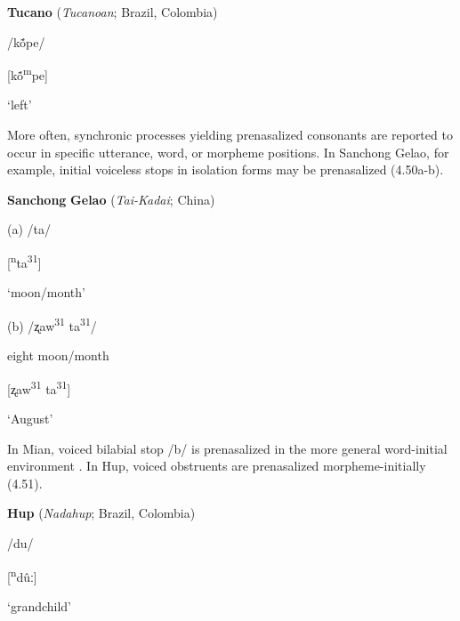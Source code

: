 \ea\label{ex:(4.49)}
  \textbf{Tucano} (\textit{Tucanoan}; Brazil, Colombia)



/kṍpe/



[kṍ\textsuperscript{m}pe]



‘left’



\citep[11]{West1980}


\z

  More often, synchronic processes yielding prenasalized consonants are reported to occur in specific utterance, word, or morpheme positions. In Sanchong Gelao, for example, initial voiceless stops in isolation forms may be prenasalized (4.50a-b).



\ea\label{ex:(4.50)}
  \textbf{Sanchong} \textbf{Gelao} (\textit{Tai-Kadai}; China)



(a)  /ta/



  [\textsuperscript{n}ta\textsuperscript{31}]



  ‘moon/month’



(b)  /ʐaw\textsuperscript{31}   ta\textsuperscript{31}/



  eight   moon/month



  [ʐaw\textsuperscript{31} ta\textsuperscript{31}]



  ‘August’



\citep[40]{Shen2003}

\z


  In Mian, voiced bilabial stop /b/ is prenasalized in the more general word-initial environment \citep{Fedden2007}. In Hup, voiced obstruents are prenasalized morpheme-initially (4.51).



\ea\label{ex:(4.51)}
  \textbf{Hup} (\textit{Nadahup}; Brazil, Colombia)



/du/



[\textsuperscript{n}dûː]



‘grandchild’



